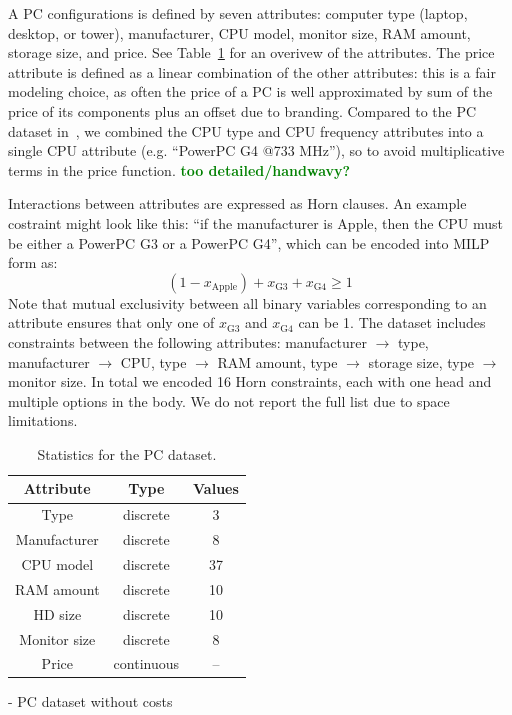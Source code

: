 \documentclass{article}
\renewcommand\[{\begin{equation}}
\renewcommand\]{\end{equation}}
\newcommand{\stefano}[1]{{\bf \textcolor{green}{{\fbox{Stefano:} #1}}}}
\begin{document}
A PC configurations is defined by seven attributes: computer type (laptop,
desktop, or tower), manufacturer, CPU model, monitor size, RAM amount, storage
size, and price. See Table~\ref{tab:pcdataset} for an overivew of the
attributes. The price attribute is defined as a linear combination of the other
attributes: this is a fair modeling choice, as often the price of a PC is
well approximated by sum of the price of its components plus an offset due to
branding. Compared to the PC dataset in~\cite{guo2010real}, we combined the CPU
type and CPU frequency attributes into a single CPU attribute (e.g. ``PowerPC
G4 @733 MHz''), so to avoid multiplicative terms in the price function.
\stefano{too detailed/handwavy?}

Interactions between attributes are expressed as Horn clauses. An example
costraint might look like this: ``if the manufacturer is Apple, then the
CPU must be either a PowerPC G3 or a PowerPC G4'', which can be encoded
into MILP form as:
%
$$ (1 - x_\text{Apple}) + x_\text{G3} + x_\text{G4} \ge 1 $$
%
Note that mutual exclusivity between all binary variables corresponding to an
attribute ensures that only one of $x_\text{G3}$ and $x_\text{G4}$ can be 1.
The dataset includes constraints between the following attributes: manufacturer
$\to$ type, manufacturer $\to$ CPU, type $\to$ RAM amount, type $\to$ storage
size, type $\to$ monitor size. In total we encoded 16 Horn constraints, each
with one head and multiple options in the body. We do not report the full
list due to space limitations.

\begin{table}
    \centering
    \begin{tabular}{ccc}
        {\bf Attribute} & {\bf Type} & {\bf Values} \\
        \hline \hline
        Type & discrete & 3 \\
        Manufacturer & discrete & 8 \\
        CPU model & discrete & 37 \\
        RAM amount & discrete & 10 \\
        HD size & discrete & 10 \\
        Monitor size & discrete & 8 \\
        Price & continuous & --
    \end{tabular}
    \caption{\label{tab:pcdataset} Statistics for the PC dataset.}
\end{table}

- PC dataset without costs
\end{document}
